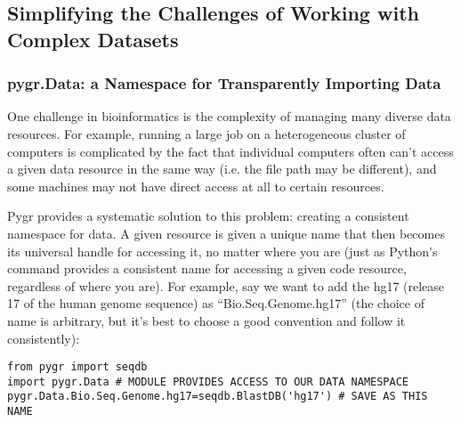 \documentclass{howto}
\begin{document}
\subsection{Simplifying the Challenges of Working with Complex Datasets}
\subsubsection{pygr.Data: a Namespace for Transparently Importing Data}
One challenge in bioinformatics is the complexity of managing many diverse
data resources.  For example, running a large job on a heterogeneous cluster
of computers is complicated by the fact that individual computers often can't
access a given data resource in the same way (i.e. the file path may be different),
and some machines may not have direct access at all to certain resources.

Pygr provides a systematic solution to this problem: creating a consistent
namespace for data.  A given resource is given a unique name that then becomes
its universal handle for accessing it, no matter where you are (just as Python's
 command provides a consistent name for accessing a given code
resource, regardless of where you are).  For example, say we want to add the
hg17 (release 17 of the human genome sequence) as ``Bio.Seq.Genome.hg17''
(the choice of name is arbitrary, but it's best to choose a good convention and follow
it consistently):

\begin{verbatim}
from pygr import seqdb
import pygr.Data # MODULE PROVIDES ACCESS TO OUR DATA NAMESPACE
pygr.Data.Bio.Seq.Genome.hg17=seqdb.BlastDB('hg17') # SAVE AS THIS NAME
\end{verbatim}
\end{document}
